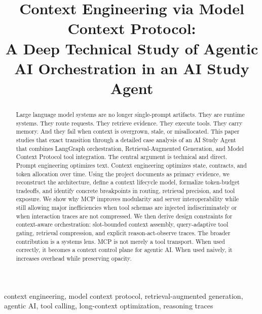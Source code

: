\documentclass[conference]{IEEEtran}
\begin{document}
\title{Context Engineering via Model Context Protocol:\\
A Deep Technical Study of Agentic AI Orchestration in an AI Study Agent}

\author{
}

\maketitle

\begin{abstract}
Large language model systems are no longer single-prompt artifacts.
They are runtime systems.
They route requests.
They retrieve evidence.
They execute tools.
They carry memory.
And they fail when context is overgrown, stale, or misallocated.
This paper studies that exact transition through a detailed case analysis of an AI Study Agent that combines LangGraph orchestration, Retrieval-Augmented Generation, and Model Context Protocol tool integration.
The central argument is technical and direct.
Prompt engineering optimizes text.
Context engineering optimizes state, contracts, and token allocation over time.
Using the project documents as primary evidence, we reconstruct the architecture, define a context lifecycle model, formalize token-budget tradeoffs, and identify concrete breakpoints in routing, retrieval precision, and tool exposure.
We show why MCP improves modularity and server interoperability while still allowing major inefficiencies when tool schemas are injected indiscriminately or when interaction traces are not compressed.
We then derive design constraints for context-aware orchestration: slot-bounded context assembly, query-adaptive tool gating, retrieval compression, and explicit reason-act-observe traces.
The broader contribution is a systems lens.
MCP is not merely a tool transport.
When used correctly, it becomes a context control plane for agentic AI.
When used naively, it increases overhead while preserving opacity.
\end{abstract}

\begin{IEEEkeywords}
context engineering, model context protocol, retrieval-augmented generation, agentic AI, tool calling, long-context optimization, reasoning traces
\end{IEEEkeywords}
\end{document}
